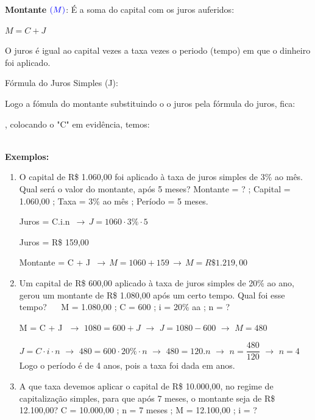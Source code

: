 \begin{multicols*}{2}
	\textbf{Montante} $\color{blue}(M)$: É a soma do capital com os juros auferidos:
	
	\textbf{\color{blue}$M = C + J$}
	
	O juros é igual ao capital vezes a taxa vezes o periodo (tempo) em que o dinheiro foi aplicado.		
	
	Fórmula do Juros Simples (J):
	
	\textbf{}
	
	Logo a fómula do montante substituindo o o juros pela fórmula do juros, fica:
	
	\textbf{}, colocando o "C" em evidência, temos:
	
	\textbf{}\\
	
	\textbf{Exemplos:}

	\begin{enumerate}
	
	\item O capital de R\$ 1.060,00 foi aplicado à taxa de juros simples de 3\% ao mês. Qual será o valor do montante, após 5 meses?		Montante = ?  ;  Capital = 1.060,00  ;  Taxa = 3\% ao mês  ;  Período = 5 meses.
	
	Juros = C.i.n  $\, \rightarrow \,  J = 1060 \cdot 3\% \cdot 5$
	
	Juros = R\$ 159,00
	
	Montante = C + J $ \, \rightarrow \, M = 1060 + 159 \, \rightarrow \, M = R\$1.219,00$
	
	\item Um capital de R\$ 600,00 aplicado à taxa de juros simples de 20\% ao ano, gerou  um  montante  de R\$ 1.080,00 após um certo tempo. Qual foi esse tempo?  $\, \, \, \, \, \, $  M = 1.080,00 ; C = 600 ; i = 20\% aa ; n = ?
	
	M = C + J $\, \, \rightarrow \, \,  1080 = 600 + J \, \, \rightarrow \, \, J = 1080 - 600 \, \, \rightarrow \, \, M= 480$
	
	$ J = C\cdot i \cdot n \, \, \rightarrow \, \, 480 = 600 \cdot 20\% \cdot n \, \, \rightarrow \, \, 480 = 120.n \, \, \rightarrow \, \, n = \dfrac{480}{120}\, \, \rightarrow \, \, n = 4 $ Logo o período é de 4 anos, pois a taxa foi dada em anos.
	
	\item A que taxa devemos aplicar o capital de R\$ 10.000,00, no regime de capitalização simples, para que após 7 meses, o montante seja de R\$ 12.100,00?  C = 10.000,00  ;  n = 7 meses  ;  M = 12.100,00 ;  i = ?
	

\end{enumerate}
\end{multicols*}
